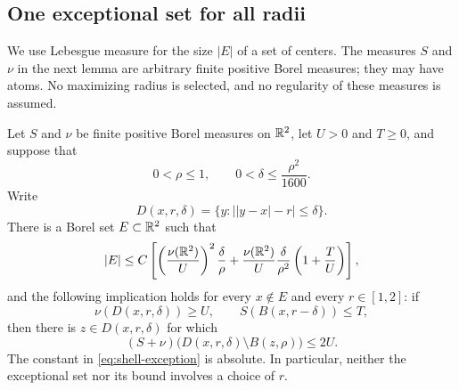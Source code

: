 \subsection{One exceptional set for all radii}

We use Lebesgue measure for the size $|E|$ of a set of centers. The
measures $S$ and $\nu$ in the next lemma are arbitrary finite positive
Borel measures; they may have atoms. No maximizing radius is selected,
and no regularity of these measures is assumed.

\begin{lemma}\label{lem:shell-concentration}
Let $S$ and $\nu$ be finite positive Borel measures on $\mathbb R^2$, let
$U>0$ and $T\ge0$, and suppose that
\[
0<\rho\le1,
\qquad 0<\delta\le\frac{\rho^2}{1600}.
\]
Write
\[
D(x,r,\delta)=\{y:\bigl||y-x|-r\bigr|\le\delta\}.
\]
There is a Borel set $E\subset\mathbb R^2$ such that
\begin{equation}\label{eq:shell-exception}
|E|\le C\left[
  \left(\frac{\nu(\mathbb R^2)}{U}\right)^2\frac{\delta}{\rho}
  +\frac{\nu(\mathbb R^2)}{U}\frac{\delta}{\rho^2}
           \left(1+\frac{T}{U}\right)\right],
\end{equation}
and the following implication holds for every $x\notin E$ and every
$r\in[1,2]$: if
\begin{equation}\label{eq:shell-hypotheses}
\nu(D(x,r,\delta))\ge U,
\qquad S(B(x,r-\delta))\le T,
\end{equation}
then there is $z\in D(x,r,\delta)$ for which
\begin{equation}\label{eq:shell-cap}
(S+\nu)\bigl(D(x,r,\delta)\setminus B(z,\rho)\bigr)\le2U.
\end{equation}
The constant in \eqref{eq:shell-exception} is absolute. In particular,
neither the exceptional set nor its bound involves a choice of $r$.
\end{lemma}

